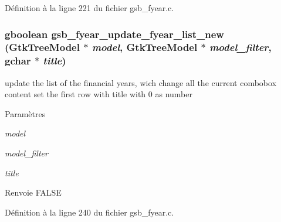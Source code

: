 Définition à la ligne 221 du fichier gsb\_\-fyear.c.

\subsubsection[{gsb\_\-fyear\_\-update\_\-fyear\_\-list\_\-new}]{\setlength{\rightskip}{0pt plus 5cm}gboolean gsb\_\-fyear\_\-update\_\-fyear\_\-list\_\-new (GtkTreeModel $\ast$ {\em model}, \/  GtkTreeModel $\ast$ {\em model\_\-filter}, \/  gchar $\ast$ {\em title})}\label{gsb__fyear_8h_a34d75e7b50bee69ad545dcea4df88f9a}
update the list of the financial years, wich change all the current combobox content set the first row with title with 0 as number


\begin{DoxyParams}{Paramètres}
\item[{\em model}]\item[{\em model\_\-filter}]\item[{\em title}]\end{DoxyParams}
\begin{DoxyReturn}{Renvoie}
FALSE 
\end{DoxyReturn}


Définition à la ligne 240 du fichier gsb\_\-fyear.c.

